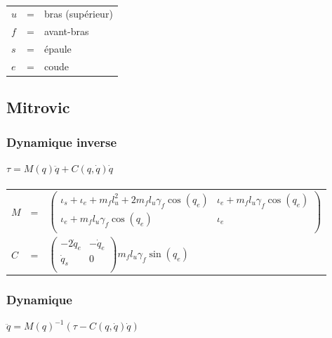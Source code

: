 \documentclass[pdftex,a4paper,11pt]{article}
\begin{document}
\paragraph{}
\begin{tabular}{lcl}
    $u$ & = & bras (supérieur)\\
    $f$ & = & avant-bras\\
    $s$ & = & épaule\\
    $e$ & = & coude\\
\end{tabular}


\subsection{Mitrovic}

\subsubsection{Dynamique inverse}
$\tau = M(q)\ddot{q} + C(q, \dot{q}) \dot{q}$

\paragraph{}
\begin{tabular}{lcl}
    $M$ & = &
    $
    \begin{pmatrix}
        \iota_s + \iota_e + m_f l_u^2 + 2 m_f l_u \gamma_f \cos(q_e)  &  \iota_e + m_f l_u \gamma_f \cos(q_e) \\
        \iota_e + m_f l_u \gamma_f \cos(q_e)  &  \iota_e\\
    \end{pmatrix}
    $ \\

    $C$ & = &
    $
    \begin{pmatrix}
        -2 \dot{q}_e  &  -\dot{q}_e \\
        \dot{q}_s     &  0\\
    \end{pmatrix}
    m_f l_u \gamma_f \sin(q_e)
    $\\
\end{tabular}

\subsubsection{Dynamique}
$\ddot{q} = M(q)^{-1} (\tau - C(q, \dot{q}) \dot{q}) $
\end{document}
